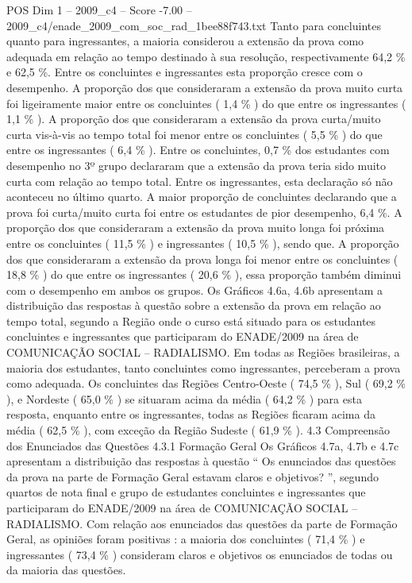 \begin{textsample}{POS Dim 1 – 2009\_c4 – Score -7.00 – 2009\_c4/enade\_2009\_com\_soc\_rad\_1bee88f743.txt}
Tanto para concluintes quanto para ingressantes, a maioria considerou a extensão da prova como adequada em relação ao tempo destinado à sua resolução, respectivamente 64,2 \% e 62,5 \%.
Entre os concluintes e ingressantes esta proporção cresce com o desempenho.
A proporção dos que consideraram a extensão da prova muito curta foi ligeiramente maior entre os concluintes ( 1,4 \% ) do que entre os ingressantes ( 1,1 \% ).
A proporção dos que consideraram a extensão da prova curta/muito curta vis-à-vis ao tempo total foi menor entre os concluintes ( 5,5 \% ) do que entre os ingressantes ( 6,4 \% ).
Entre os concluintes, 0,7 \% dos estudantes com desempenho no 3º grupo declararam que a extensão da prova teria sido muito curta com relação ao tempo total.
Entre os ingressantes, esta declaração só não aconteceu no último quarto.
A maior proporção de concluintes declarando que a prova foi curta/muito curta foi entre os estudantes de pior desempenho, 6,4 \%.
A proporção dos que consideraram a extensão da prova muito longa foi próxima entre os concluintes ( 11,5 \% ) e ingressantes ( 10,5 \% ), sendo que.
A proporção dos que consideraram a extensão da prova longa foi menor entre os concluintes ( 18,8 \% ) do que entre os ingressantes ( 20,6 \% ), essa proporção também diminui com o desempenho em ambos os grupos.
Os Gráficos 4.6a, 4.6b apresentam a distribuição das respostas à questão sobre a extensão da prova em relação ao tempo total, segundo a Região onde o curso está situado para os estudantes concluintes e ingressantes que participaram do ENADE/2009 na área de COMUNICAÇÃO SOCIAL – RADIALISMO.
Em todas as Regiões brasileiras, a maioria dos estudantes, tanto concluintes como ingressantes, perceberam a prova como adequada.
Os concluintes das Regiões Centro-Oeste ( 74,5 \% ), Sul ( 69,2 \% ), e Nordeste ( 65,0 \% ) se situaram acima da média ( 64,2 \% ) para esta resposta, enquanto entre os ingressantes, todas as Regiões ficaram acima da média ( 62,5 \% ), com exceção da Região Sudeste ( 61,9 \% ). 4.3 Compreensão dos Enunciados das Questões 4.3.1 Formação Geral Os Gráficos 4.7a, 4.7b e 4.7c apresentam a distribuição das respostas à questão “ Os enunciados das questões da prova na parte de Formação Geral estavam claros e objetivos? ”, segundo quartos de nota final e grupo de estudantes concluintes e ingressantes que participaram do ENADE/2009 na área de COMUNICAÇÃO SOCIAL – RADIALISMO.
Com relação aos enunciados das questões da parte de Formação Geral, as opiniões foram positivas : a maioria dos concluintes ( 71,4 \% ) e ingressantes ( 73,4 \% ) consideram claros e objetivos os enunciados de todas ou da maioria das questões.

\end{textsample}

